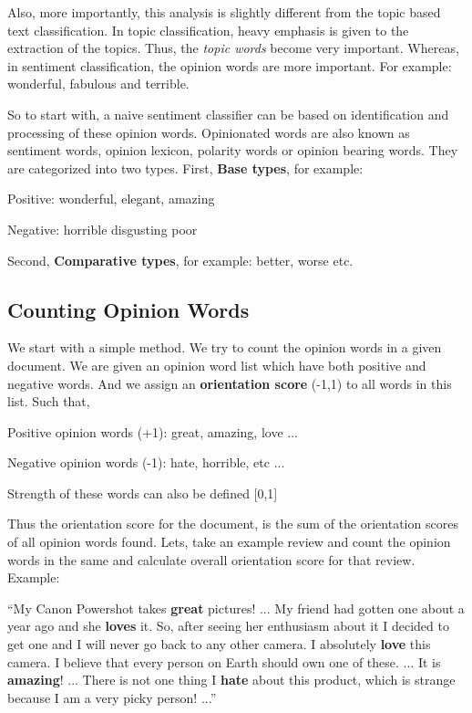 Also, more importantly,  this analysis is slightly different from the topic based text classification. In topic classification, heavy emphasis is given to the extraction of the topics. Thus, the \textit{topic words} become very important.  Whereas, in sentiment classification, the opinion words are more important. For example: wonderful, fabulous and terrible. 

So to start with, a naive sentiment classifier can be based on identification and processing of these opinion words. Opinionated words are also known as sentiment words, opinion lexicon, polarity words or opinion bearing words. They are categorized into two types. First, \textbf{Base types}, for example:

Positive: wonderful, elegant, amazing

Negative: horrible disgusting poor

Second, \textbf{Comparative types}, for example: better, worse etc.

\subsection{Counting Opinion Words}

We start with a simple method. We try to count the opinion words in a given document. We are given an opinion word list which have both positive and negative words. And we assign an \textbf{orientation score} (-1,1) to all words in this list. Such that, \newline

Positive opinion words (+1): great, amazing, love ...

Negative opinion words (-1): hate, horrible, etc ...

Strength of these words can also be defined [0,1] 
\newline

Thus the orientation score for the document, is the sum of the orientation scores of all opinion words found. Lets, take an example review and count the opinion words in the same and calculate overall orientation score for that review. Example:

“My Canon Powershot takes \textbf{great} pictures! ... My friend had gotten one about a year ago and she \textbf{loves} it. So, after seeing her enthusiasm about it I decided to get one and I will never go back to any other camera. I absolutely \textbf{love} this camera. I believe that every person on Earth should own one of these. ... It is \textbf{amazing}! ... There is not one thing I \textbf{hate} about this product, which is strange because I am a very picky person! ...”

